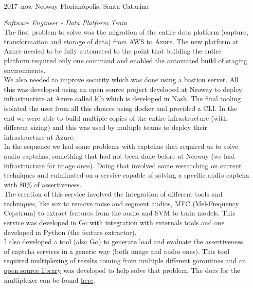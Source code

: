 \documentclass[]{friggeri-cv} %
\begin{document}
\begin{entrylist}
\entry
{2017--now}
{Neoway}
{Florianópolis, Santa Catarina}
{\emph{Software Engineer - Data Platform Team} \\

The first problem to solve was the migration
of the entire data platform (capture, transformation
and storage of data) from AWS to Azure. The new platform
at Azure needed to be fully automated to the point
that building the entire platform required only one
command and enabled the automated build
of staging environments.\\

We also needed to improve security
which was done using a bastion server. All this was developed
using an open source project developed at Neoway to deploy
infrastructure at Azure called
{\href{https://github.com/NeowayLabs/klb}{klb}} which is
developed in Nash. The final
tooling isolated the user from all this choices using docker
and provided a CLI. In the end we were able to build
multiple copies of the entire infrastructure (with different
sizing) and this was used by multiple teams to deploy
their infrastructure at Azure.\\

In the sequence we had some problems with captchas that
required us to solve audio captchas, something that had not
been done before at Neoway (we had infrastructure for image ones).
Doing that involved some researching
on current techniques and culminated on a service capable
of solving a specific audio captcha with 80\% of assertiveness.\\

The creation of this service involved the integration of different
tools and techniques, like sox to remove noise and segment audios,
MFC (Mel-Frequency Cepstrum) to extract features from the audio
and SVM to train models. This service was developed in Go with
integration with externals tools and one developed in Python
(the feature extractor).\\

I also developed a tool (also Go) to generate load and evaluate the
assertiveness of captcha services in a generic way
(both image and audio ones). This tool required multiplexing
of results coming from multiple different goroutines and an
{\href{https://github.com/madlambda/spells}{open source library}}
was developed to help solve that problem. The docs for the multiplexer
can be found {\href{https://godoc.org/github.com/madlambda/spells}{here}}.

}
\end{entrylist}
\end{document}
